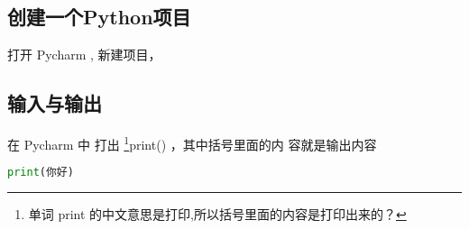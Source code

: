 
\subsection{创建一个Python项目}

打开 Pycharm , 新建项目，

\subsection{输入与输出}

在 Pycharm 中 打出 \footnote{单词 print 的中文意思是打印,所以括号里面的内容是打印出来的？}print() ，其中括号里面的内
容就是输出内容 

\begin{lstlisting}[language=python]
print(你好)
\end{lstlisting}
